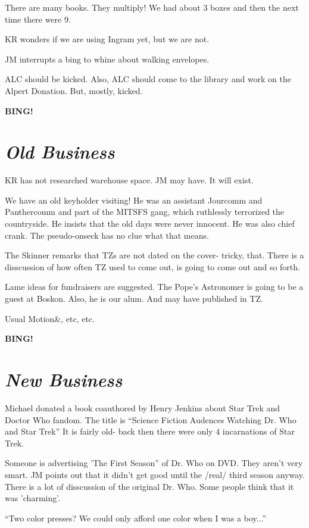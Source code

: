 \documentclass[10pt]{article}
\newcommand{\bing}{{\bf BING!} }
\newcommand{\goto}[1]{\bing \vskip 12pt \section*{{\em{#1}}}}
\begin{document}
There are many books. They multiply! We had about 3 boxes and then the next time there were 9.

KR wonders if we are using Ingram yet, but we are not.

JM interrupts a bing to whine about walking envelopes.

ALC should be kicked. Also, ALC should come to the library and work on the Alpert Donation. But, mostly, kicked.



\goto{Old Business}

KR has not researched warehouse space. JM may have. It will exist.

We have an old keyholder visiting! He was an assistant Jourcomm and Panthercomm and part of the MITSFS gang, which ruthlessly terrorized the countryside. He insists that the old days were never innocent. He was also chief crank. The pseudo-onseck has no clue what that means.

The Skinner remarks that TZs are not dated on the cover- tricky, that. There is a disscussion of how often TZ used to come out, is going to come out and so forth.

Lame ideas for fundraisers are suggested. The Pope's Astronomer is going to be a guest at Boskon. Also, he is our alum. And may have published in TZ. 

Usual Motion&, etc, etc.

\goto{New Business}

Michael donated a book coauthored by Henry Jenkins about Star Trek and Doctor Who fandom. The title is ``Science Fiction Audences Watching Dr. Who and Star Trek'' It is fairly old- back then there were only 4 incarnations of Star Trek.

Someone is advertising 'The First Season'' of Dr. Who on DVD. They aren't very smart. JM points out that it didn't get good until the /real/ third season anyway. There is a lot of disscussion of the original Dr. Who. Some people think that it was 'charming'.

``Two color presses? We could only afford one color when I was a boy...''
\end{document}
